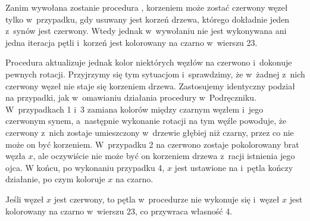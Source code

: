 \bignegskip

\exercise %
Zanim wywołana zostanie procedura , korzeniem może zostać czerwony węzeł tylko w~przypadku, gdy usuwany jest korzeń drzewa, którego dokładnie jeden z~synów jest czerwony.
Wtedy jednak w~wywołaniu  nie jest wykonywana ani jedna iteracja pętli  i~korzeń jest kolorowany na czarno w~wierszu 23.

Procedura  aktualizuje jednak kolor niektórych węzłów na czerwono i~dokonuje pewnych rotacji.
Przyjrzymy się tym sytuacjom i~sprawdzimy, że w~żadnej z~nich czerwony węzeł nie staje się korzeniem drzewa.
Zastosujemy identyczny podział na przypadki, jak w~omawianiu działania procedury w~Podręczniku.
W~przypadkach 1 i~3 zamiana kolorów między czarnym węzłem i~jego czerwonym synem, a~następnie wykonanie rotacji na tym węźle powoduje, że czerwony z~nich zostaje umieszczony w~drzewie głębiej niż czarny, przez co nie może on być korzeniem.
W~przypadku 2 na czerwono zostaje pokolorowany brat węzła $x$, ale oczywiście nie może być on korzeniem drzewa z~racji istnienia jego ojca.
W końcu, po wykonaniu przypadku 4, $x$ jest ustawione na  i~pętla kończy działanie, po czym koloruje $x$ na czarno.

\exercise %
Jeśli węzeł $x$ jest czerwony, to pętla  w~procedurze  nie wykonuje się i~węzeł $x$ jest kolorowany na czarno w~wierszu 23, co przywraca własność 4.

